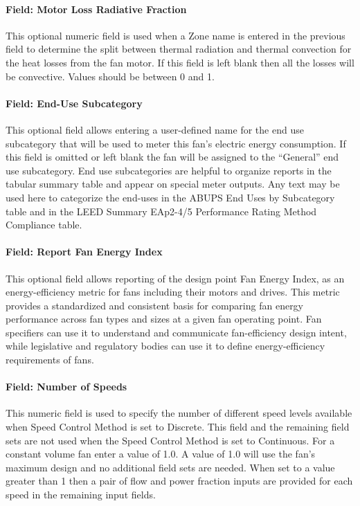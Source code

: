 \paragraph{Field: Motor Loss Radiative Fraction}\label{field-loss-rad-frac-fansysmodel}

This optional numeric field is used when a Zone name is entered in the previous field to determine the split between thermal radiation and thermal convection for the heat losses from the fan motor. If this field is left blank then all the losses will be convective.  Values should be between 0 and 1.

\paragraph{Field: End-Use Subcategory}\label{field-end-use-subcat-fansysmodel}

This optional field allows entering a user-defined name for the end use subcategory that will be used to meter this fan's electric energy consumption. If this field is omitted or left blank the fan will be assigned to the ``General'' end use subcategory.  End use subcategories are helpful to organize reports in the tabular summary table and appear on special meter outputs. Any text may be used here to categorize the end-uses in the ABUPS End Uses by Subcategory table and in the LEED Summary EAp2-4/5 Performance Rating Method Compliance table.

\paragraph{Field: Report Fan Energy Index}\label{field-report-fan-energy-index}

This optional field allows reporting of the design point Fan Energy Index, as an energy-efficiency metric for fans including their motors and drives. This metric provides a standardized and consistent basis for comparing fan energy performance across fan types and sizes at a given fan operating point. Fan specifiers can use it to understand and communicate fan-efficiency design intent, while legislative and regulatory bodies can use it to define energy-efficiency requirements of fans.

\paragraph{Field: Number of Speeds}\label{field-num-speeds-fansysmodel}

This numeric field is used to specify the number of different speed levels available when Speed Control Method is set to Discrete.  This field and the remaining field sets are not used when the Speed Control Method is set to Continuous.  For a constant volume fan enter a value of 1.0.  A value of 1.0 will use the fan's maximum design and no additional field sets are needed.  When set to a value greater than 1 then a pair of flow and power fraction inputs are provided for each speed in the remaining input fields.

